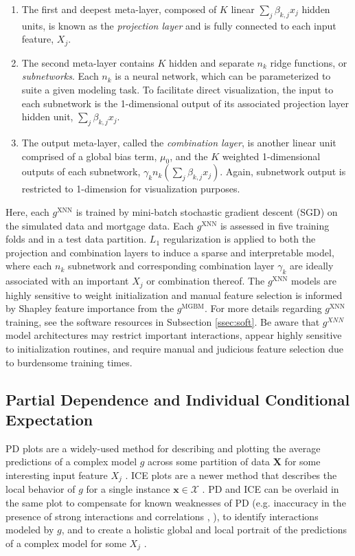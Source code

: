 \documentclass[information,article,submit,moreauthors,pdftex]{definitions/mdpi}
\begin{document}
\begin{enumerate}[leftmargin=*,labelsep=4.9mm]
\item The first and deepest meta-layer, composed of $K$ linear $\sum_j\beta_{k,j}x_j$ hidden units, is known as the \textit{projection layer} and is fully connected to each input feature, $X_j$.
\item The second meta-layer contains $K$ hidden and separate $n_k$ ridge functions, or \textit{subnetworks}. Each $n_k$ is a neural network, which can be parameterized to suite a given modeling task. To facilitate direct visualization, the input to each subnetwork is the 1-dimensional output of its associated projection layer hidden unit, $\sum_j\beta_{k,j}x_j$.
\item The output meta-layer, called the \textit{combination layer}, is another linear unit comprised of a global bias term, $\mu_0$, and the $K$ weighted 1-dimensional outputs of each subnetwork, $\gamma_kn_k(\sum_j\beta_{k,j}x_j)$. Again, subnetwork output is restricted to 1-dimension for visualization purposes.
\end{enumerate}

Here, each $g^\text{XNN}$ is trained by mini-batch stochastic gradient descent (SGD) on the simulated data and mortgage data. Each $g^\text{XNN}$ is assessed in five training folds and in a test data partition.  $L_1$ regularization is applied to both the projection and combination layers to induce a sparse and interpretable model, where each $n_k$ subnetwork and corresponding combination layer $\gamma_k$ are ideally associated with an important $X_j$ or combination thereof. The $g^\text{XNN}$ models are highly sensitive to weight initialization and manual feature selection is informed by Shapley feature importance from the $g^\text{MGBM}$. For more details regarding $g^\text{XNN}$ training, see the software resources in Subsection \ref{ssec:soft}. Be aware that $g^{XNN}$ model architectures may restrict important interactions, appear highly sensitive to initialization routines, and require manual and judicious feature selection due to burdensome training times. 

\subsection{Partial Dependence and Individual Conditional Expectation}\label{ssec:pd_ice}

PD plots are a widely-used method for describing and plotting the average predictions of a complex model $g$ across some partition of data $\mathbf{X}$ for some interesting input feature $X_j$ \cite{esl}. ICE plots are a newer method that describes the local behavior of $g$ for a single instance $\mathbf{x} \in \mathcal{X}$ \cite{ice_plots}. PD and ICE can be overlaid in the same plot to compensate for known weaknesses of PD (e.g. inaccuracy in the presence of strong interactions and correlations \cite{ice_plots}, \cite{ale_plot}), to identify interactions modeled by $g$, and to create a holistic global and local portrait of the predictions of a complex model for some $X_j$ \cite{ice_plots}.
\end{document}
